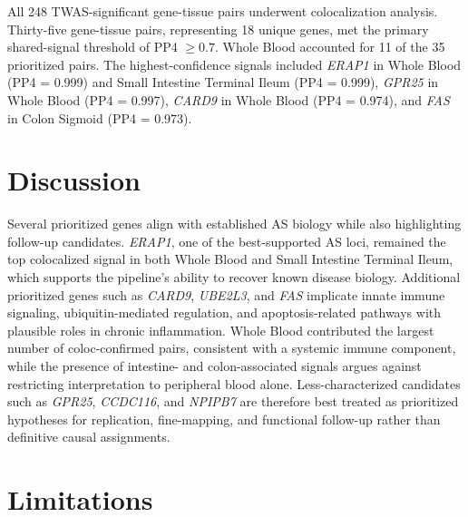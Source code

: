 \documentclass[12pt,a4paper]{article}
\begin{document}
All 248 TWAS-significant gene-tissue pairs underwent colocalization analysis.
Thirty-five gene-tissue pairs, representing 18 unique genes, met the primary
shared-signal threshold of PP4 $\geq 0.7$. Whole Blood accounted for 11 of the
35 prioritized pairs. The highest-confidence signals included
\textit{ERAP1} in Whole Blood (PP4 = 0.999) and Small Intestine Terminal
Ileum (PP4 = 0.999), \textit{GPR25} in Whole Blood (PP4 = 0.997),
\textit{CARD9} in Whole Blood (PP4 = 0.974), and \textit{FAS} in Colon
Sigmoid (PP4 = 0.973).



\section{Discussion}

Several prioritized genes align with established AS biology while also
highlighting follow-up candidates. \textit{ERAP1}, one of the best-supported
AS loci, remained the top colocalized signal in both Whole Blood and Small
Intestine Terminal Ileum, which supports the pipeline's ability to recover
known disease biology. Additional prioritized genes such as \textit{CARD9},
\textit{UBE2L3}, and \textit{FAS} implicate innate immune signaling,
ubiquitin-mediated regulation, and apoptosis-related pathways with plausible
roles in chronic inflammation. Whole Blood contributed the largest number of
coloc-confirmed pairs, consistent with a systemic immune component, while the
presence of intestine- and colon-associated signals argues against restricting
interpretation to peripheral blood alone. Less-characterized candidates such
as \textit{GPR25}, \textit{CCDC116}, and \textit{NPIPB7} are therefore best
treated as prioritized hypotheses for replication, fine-mapping, and
functional follow-up rather than definitive causal assignments.

\section{Limitations}
\end{document}
